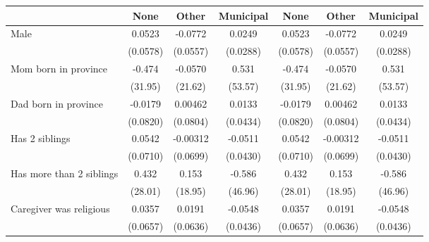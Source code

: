 {
\def\sym#1{\ifmmode^{#1}\else\(^{#1}\)\fi}
\begin{tabular}{l*{6}{c}}
\toprule
                    &\multicolumn{1}{c}{None}&\multicolumn{1}{c}{Other}&\multicolumn{1}{c}{Municipal}&\multicolumn{1}{c}{None}&\multicolumn{1}{c}{Other}&\multicolumn{1}{c}{Municipal}\\
\midrule
Male                &      0.0523         &     -0.0772         &      0.0249         &      0.0523         &     -0.0772         &      0.0249         \\
                    &    (0.0578)         &    (0.0557)         &    (0.0288)         &    (0.0578)         &    (0.0557)         &    (0.0288)         \\
\addlinespace
Mom born in province&      -0.474         &     -0.0570         &       0.531         &      -0.474         &     -0.0570         &       0.531         \\
                    &     (31.95)         &     (21.62)         &     (53.57)         &     (31.95)         &     (21.62)         &     (53.57)         \\
\addlinespace
Dad born in province&     -0.0179         &     0.00462         &      0.0133         &     -0.0179         &     0.00462         &      0.0133         \\
                    &    (0.0820)         &    (0.0804)         &    (0.0434)         &    (0.0820)         &    (0.0804)         &    (0.0434)         \\
\addlinespace
Has 2 siblings      &      0.0542         &    -0.00312         &     -0.0511         &      0.0542         &    -0.00312         &     -0.0511         \\
                    &    (0.0710)         &    (0.0699)         &    (0.0430)         &    (0.0710)         &    (0.0699)         &    (0.0430)         \\
\addlinespace
Has more than 2 siblings&       0.432         &       0.153         &      -0.586         &       0.432         &       0.153         &      -0.586         \\
                    &     (28.01)         &     (18.95)         &     (46.96)         &     (28.01)         &     (18.95)         &     (46.96)         \\
\addlinespace
Caregiver was religious&      0.0357         &      0.0191         &     -0.0548         &      0.0357         &      0.0191         &     -0.0548         \\
                    &    (0.0657)         &    (0.0636)         &    (0.0436)         &    (0.0657)         &    (0.0636)         &    (0.0436)         \\

\end{tabular}}
